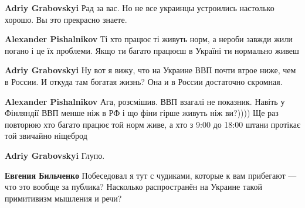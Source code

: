 \begin{itemize}
\begin{itemize}
\textbf{Adriy Grabovskyi} Рад за вас. Но не все украинцы устроились настолько хорошо. Вы это прекрасно знаете.

 
\textbf{Alexander Pishalnikov} Ті хто працює ті живуть норм, а нероби завжди жили погано і це їх проблеми. Якщо ти багато працюєш в Україні ти нормально живеш

 
\textbf{Adriy Grabovskyi} Ну вот я вижу, что на Украине ВВП почти втрое ниже, чем в России. И откуда там богатая жизнь? Она и в России достаточно скромная.

 
\textbf{Alexander Pishalnikov} Ага, розсмішив. ВВП взагалі не показник. Навіть у Фінляндії ВВП менше ніж в РФ і що фіни гірше живуть ніж ви?)))) Ще раз повторюю хто багато працює той норм живе, а хто з 9:00 до 18:00 штани протікає той звичайно ніщеброд

 
\textbf{Adriy Grabovskyi} Глупо.

 
\textbf{Евгения Бильченко} Побеседовал я тут с чудиками, которые к вам прибегают — что это вообще за публика? Насколько распространён на Украине такой примитивизм мышления и речи?


\end{itemize}
\end{itemize}
